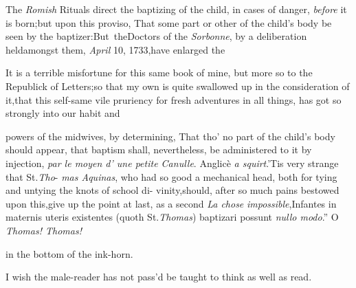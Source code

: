 \documentclass{article}
\begin{document}
\vfill
\bgroup\fontsize{8}{11}\selectfont
\indent\fnast\enspace The \textit{Romish} Rituals direct
the baptizing of the child, in cases of danger, \textit{before} it is born;\tsk but
upon this proviso, That some part or other of the child’s body be seen by the
baptizer:\tsh But~the\break Doctors of the \textit{Sorbonne}, by a deliberation
held\break amongst them, \textit{April} 10, 1733,\tsk have enlarged
the\break{}\par\egroup\eject

It is a terrible misfortune for this same book of mine, but more
so to the Republick of Letters;\tsk so that my own\break
is quite swallowed up in the consideration of it,\tsk that this
self-same vile pruriency for fresh adventures in all things, has
got so strongly into our habit and 
\break
{}


\bgroup\fontsize{8}{11}\selectfont
\noindent powers of the midwives, by determining, That\break
tho’ no part of the child’s body should appear,\tsh\break
that baptism shall, nevertheless, be administered to it by injection,\tsk
\textit{par le moyen d’ une petite Canulle}.\tsk\break
Anglicè \textit{a squirt}.\tsk ’Tis very strange that St.\@ \textit{Tho}-\break
\textit{mas Aquinas}, who had so good a mechanical head,\break
both for tying and untying the knots of school di-\break
vinity,\tsk should, after so much pains bestowed upon\break
this,\tsk give up the point at last, as a second \textit{La chose}\break
\textit{impossible},\tsk \lqq Infantes in maternis uteris existentes\break
(quoth St.\@ \textit{Thomas}) baptizari possunt \textit{nullo modo}.”\tsk\break
O \textit{Thomas! Thomas!}\\\par\egroup\eject

\noindent
{} 
in the bottom of the ink-horn.

I wish the male-reader has not pass’d
be taught to think as well as read.
\end{document}

